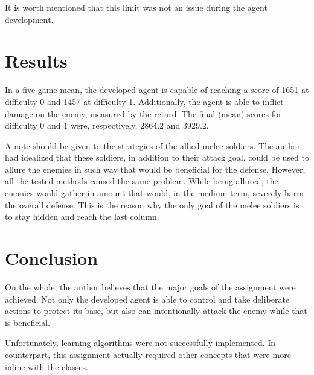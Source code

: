 \documentclass[conference]{IEEEtran}
\begin{document}
It is worth mentioned that this limit was not an issue during the agent development.




\section{Results}

In a five game mean, the developed agent is capable of reaching a score of 1651 at difficulty 0 and 1457 at difficulty 1. Additionally, the agent is able to inflict damage on the enemy, measured by the retard. The final (mean) scores for difficulty 0 and 1 were, respectively, 2864.2 and 3929.2.

A note should be given to the strategies of the allied melee soldiers. The author had idealized that these soldiers, in addition to their attack goal, could be used to allure the enemies in such way that would be beneficial for the defense. However, all the tested methods caused the same problem. While being allured, the enemies would gather in amount that would, in the medium term, severely harm the overall defense. This is the reason why the only goal of the melee soldiers is to stay hidden and reach the last column.

\section{Conclusion}

On the whole, the author believes that the major goals of the assignment were achieved. Not only the developed agent is able to control and take deliberate actions to protect its base, but also can intentionally attack the enemy while that is beneficial. 

Unfortunately, learning algorithms were not successfully implemented. In counterpart, this assignment actually required other concepts that were more inline with the classes.







\end{document}
